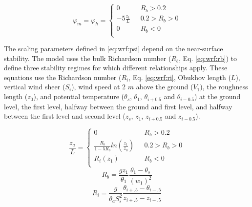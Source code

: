 \begin{equation}\label{eq:wrf:psi}
\varphi_{m} = 
\varphi_{h} = \begin{cases} 
0 & \text{    } R_{b} > 0.2 \\ 
-5 \frac{z_{1}}{L} & \text{    } 0.2 > R_{b} > 0 \\ 
0 & \text{    } R_{b} < 0 \\ 
\end{cases}
\end{equation}

The scaling parameters defined in \ref{eq:wrf:psi} depend on the near-surface stability. The model uses the bulk Richardson number ($R_{b}$, Eq. \ref{eq:wrf:rb}) to define three stability regimes for which different relationships apply. These equations use the Richardson number ($R_{i}$, Eq. \ref{eq:wrf:ri}, Obukhov length ($L$), vertical wind sheer ($S_{i}$), wind speed at 2 $m$ above the ground ($V_{1}$), the roughness length ($z_{0}$), and potential temperature ($\theta_{s}$, $\theta_{1}$, $\theta_{i+0.5}$ and $\theta_{i-0.5}$) at the ground level, the first level, halfway between the ground and first level, and halfway between the first level and second level ($z_{s}$, $z_{1}$, $z_{i+0.5}$ and $z_{i-0.5}$). 

\begin{equation}\label{eq:wrf:zal}
\frac{z_{a}}{L} = \begin{cases} 
0 & \text{    } R_{b} > 0.2 \\ 
\frac{R_{b}}{1-5R_{b}}ln(\frac{z_{1}}{z_{0}}) & \text{    } 0.2 > R_{b} > 0 \\ 
R_{i} ( z_{1} ) & \text{    }R_{b} < 0  \\ 
\end{cases}
\end{equation}
\begin{equation}\label{eq:wrf:rb}
R_{b} = \frac{gz_{1}}{\theta_{1}}\frac{\theta_{1} - \theta_{s}}{(w_{1})^{2}}
\end{equation}
\begin{equation}\label{eq:wrf:ri}
R_{i} = \frac{g}{\theta_{a}S_{i}^{2}} \frac{\theta_{i+.5} - \theta_{i-.5}}{z_{i+.5} - z_{i-.5}}
\end{equation}

